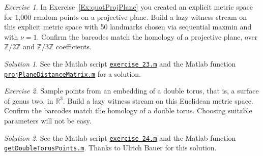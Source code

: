 \documentclass[amscd, amssymb, verbatim]{amsart}[12pt]
\theoremstyle{remark}
\theoremstyle{remark}
\newtheorem{exerciseSol}{Exercise}
\theoremstyle{remark}
\newtheorem*{solution}{Solution}
\newcommand{\R}{\mathbb{R}}
\newcommand{\Z}{\mathbb{Z}}
\begin{document}
\begin{exerciseSol}
In Exercise~\ref{Ex:quotProjPlane} you created an explicit metric space for 1,000 random points on a projective plane. Build a lazy witness stream on this explicit metric space with 50 landmarks chosen via sequential maxmin and with $\nu = 1$.  Confirm the barcodes match the homology of a projective plane, over $\Z/2\Z$ and $\Z/3\Z$ coefficients.
\end{exerciseSol}

\begin{solution}
See the Matlab script \href{https://github.com/appliedtopology/javaplex/tree/master/src/matlab/for_distribution/tutorial_solutions/exercise_23.m}{\texttt{exercise\_23.m}} and the Matlab function \href{https://github.com/appliedtopology/javaplex/tree/master/src/matlab/for_distribution/tutorial_solutions/projPlaneDistanceMatrix.m}{\texttt{projPlaneDistanceMatrix.m}} for a solution.
\end{solution}

\begin{exerciseSol}
Sample points from an embedding of a double torus, that is, a surface of genus two, in $\R^3$. Build a lazy witness stream on this Euclidean metric space. Confirm the barcodes match the homology of a double torus. Choosing suitable parameters will not be easy.
\end{exerciseSol}

\begin{solution}
See the Matlab script \href{https://github.com/appliedtopology/javaplex/tree/master/src/matlab/for_distribution/tutorial_solutions/exercise_24.m}{\texttt{exercise\_24.m}} and the Matlab function \href{https://github.com/appliedtopology/javaplex/tree/master/src/matlab/for_distribution/tutorial_solutions/getDoubleTorusPoints.m}{\texttt{getDoubleTorusPoints.m}}. Thanks to Ulrich Bauer for this solution.
\end{solution}





\end{document}
